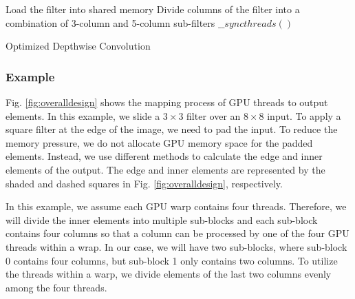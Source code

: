\begin{algorithm}[t!]
\small
	Load the filter into shared memory\;
	Divide columns of the filter into a combination of 3-column and 5-column sub-filters\;
	$\_\_syncthreads()$\;
	\caption{Optimized Depthwise Convolution}
	\label{algo:overalldesign}
\end{algorithm}

\subsubsection{Example} Fig. \ref{fig:overalldesign} shows the mapping process of GPU threads to output elements. In this example, we slide a $3
\times 3$ filter over an $8 \times 8$ input. To apply a square  filter at the edge of the image, we need to pad the input. To reduce the
memory pressure, we do not allocate GPU memory space for the padded elements. Instead, we use different methods to calculate the edge and
inner elements of the output. The edge and inner elements are represented by the shaded and dashed squares in Fig.
\ref{fig:overalldesign}, respectively.


In this example, we assume each GPU warp contains four threads. Therefore, we will divide the inner elements into multiple sub-blocks and
each sub-block contains four columns so that a column can be processed by one of the four GPU threads within a wrap. In our case, we will
have two sub-blocks, where sub-block 0 contains four columns, but sub-block 1 only contains two columns. To utilize the threads within a
warp, we divide elements of the last two columns evenly among the four threads.


